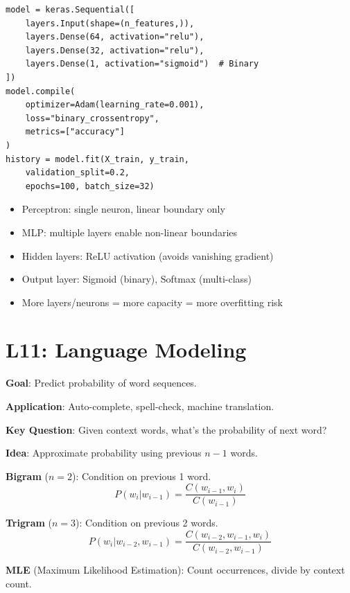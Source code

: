 \documentclass[11pt,a4paper]{article}
\begin{document}
\begin{examplebox}

\begin{verbatim}
model = keras.Sequential([
    layers.Input(shape=(n_features,)),
    layers.Dense(64, activation="relu"),
    layers.Dense(32, activation="relu"),
    layers.Dense(1, activation="sigmoid")  # Binary
])
model.compile(
    optimizer=Adam(learning_rate=0.001),
    loss="binary_crossentropy",
    metrics=["accuracy"]
)
history = model.fit(X_train, y_train,
    validation_split=0.2,
    epochs=100, batch_size=32)
\end{verbatim}
\end{examplebox}

\begin{notebox}

\begin{itemize}[leftmargin=*,nosep]
\item Perceptron: single neuron, linear boundary only
\item MLP: multiple layers enable non-linear boundaries
\item Hidden layers: ReLU activation (avoids vanishing gradient)
\item Output layer: Sigmoid (binary), Softmax (multi-class)
\item More layers/neurons = more capacity = more overfitting risk
\end{itemize}
\end{notebox}

\section{L11: Language Modeling}

\begin{definitionbox}

\textbf{Goal}: Predict probability of word sequences.

\textbf{Application}: Auto-complete, spell-check, machine translation.

\textbf{Key Question}: Given context words, what's the probability of next word?
\end{definitionbox}

\begin{definitionbox}

\textbf{Idea}: Approximate probability using previous $n-1$ words.

\textbf{Bigram} ($n=2$): Condition on previous 1 word.
\[P(w_i | w_{i-1}) = \frac{C(w_{i-1}, w_i)}{C(w_{i-1})}\]

\textbf{Trigram} ($n=3$): Condition on previous 2 words.
\[P(w_i | w_{i-2}, w_{i-1}) = \frac{C(w_{i-2}, w_{i-1}, w_i)}{C(w_{i-2}, w_{i-1})}\]

\textbf{MLE} (Maximum Likelihood Estimation): Count occurrences, divide by context count.
\end{definitionbox}
\end{document}
